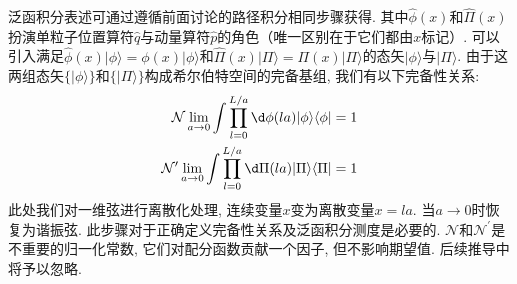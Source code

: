 泛函积分表述可通过遵循前面讨论的路径积分相同步骤获得. 其中$\hat{\phi}(x)$和$\hat{\Pi}(x)$扮演单粒子位置算符$\hat{q}$与动量算符$\hat{p}$的角色（唯一区别在于它们都由$x$标记）. 可以引入满足$\hat{\phi}(x)|\phi\rangle=\phi(x)|\phi\rangle$和$\hat{\Pi}(x)|\Pi\rangle=\Pi(x)|\Pi\rangle$的态矢$|\phi\rangle$与$|\Pi\rangle$. 由于这两组态矢$\{|\phi\rangle\}$和$\{|\Pi\rangle\}$构成希尔伯特空间的完备基组, 我们有以下完备性关系:
\begin{equation}
    \begin{aligned}\mathcal{N}\lim_{a\to0}\int\prod_{l=0}^{L/a}\d\phi(la)|\phi\rangle\langle\phi|&=1\\\mathcal{N}^{\prime}\lim_{a\to0}\int\prod_{l=0}^{L/a}\d\Pi(la)|\Pi\rangle\langle\Pi|&=1\end{aligned}
\end{equation}
此处我们对一维弦进行离散化处理, 连续变量$x$变为离散变量$x=la$. 当$a\to0$时恢复为谐振弦. 此步骤对于正确定义完备性关系及泛函积分测度是必要的. $\mathcal{N}$和$\mathcal{N}^\prime$是不重要的归一化常数, 它们对配分函数贡献一个因子, 但不影响期望值. 后续推导中将予以忽略.

